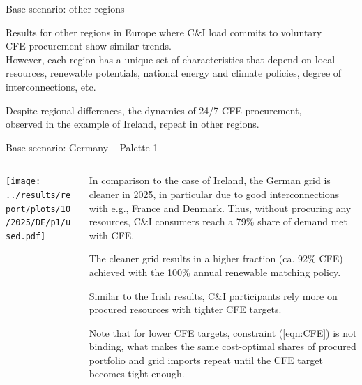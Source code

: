 \begin{frame}{Base scenario: other regions}
  \centering
  
  Results for other regions in Europe where C\&I load commits to voluntary  \\ 
  CFE procurement 
  show \alert{similar trends.} \\ 
  
  \vspace{0.3cm}
  However, each region has a \alert{unique set of characteristics} 
  that depend on local resources, renewable potentials,
  national energy and climate policies, degree of interconnections, etc.

  \vspace{0.3cm}
  Despite regional differences, the dynamics of 24/7 CFE procurement, \\
  observed in the example of Ireland, repeat in other regions.

\end{frame}


\begin{frame}{Base scenario: Germany -- Palette 1}

  {\footnotesize
  \vspace{0.1cm}
  
  \begin{columns}[T]
  \begin{column}{9cm}
  \centering
  
  \texttt{[image: ../results/report/plots/10/2025/DE/p1/used.pdf]}
  \end{column}
  \begin{column}{6cm}
  
  \vspace{0.1cm}
  In comparison to the case of Ireland, the German grid is cleaner in 2025, 
  in particular due to good interconnections with e.g., France and Denmark. 
  Thus, without procuring any resources, C\&I consumers reach
  a 79\% share of demand met with CFE.
 
  \vspace{0.3cm}
  The cleaner grid results in a higher fraction (ca. 92\% CFE)
  achieved with the 100\% annual renewable matching policy. 
  
  \vspace{0.3cm}
  Similar to the Irish results, C\&I participants rely more on procured 
  resources with tighter CFE targets.

  \vspace{0.3cm}
  Note that for lower CFE targets, constraint (\ref{eqn:CFE}) 
  is not binding, what makes the same cost-optimal shares of 
  procured portfolio and grid imports repeat
  until the CFE target becomes tight enough.
  
  \end{column}
  \end{columns}
  }
  \end{frame}
  
